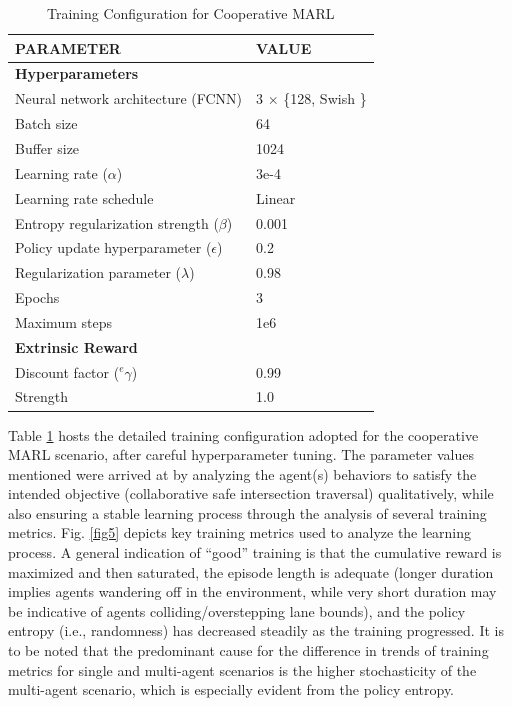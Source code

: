 \documentclass[letterpaper, 10 pt, conference]{ieeeconf}  %
\begin{document}
	\begin{table}[t]
		\caption{Training Configuration for Cooperative MARL}
		\begin{center}
			\begin{tabular}{l|l}
				\hline
				\textbf{PARAMETER}                        & \textbf{VALUE}        \\ \hline
				\multicolumn{2}{l}{\textbf{Hyperparameters}}                      \\ \hline
				Neural network architecture (FCNN)        & 3 $\times$ \{128, Swish \cite{ramachandran2017}\} \\
				Batch size                                & 64                    \\
				Buffer size                               & 1024                  \\
				Learning rate ($\alpha$)                  & 3e-4                  \\
				Learning rate schedule                    & Linear                \\
				Entropy regularization strength ($\beta$) & 0.001                 \\
				Policy update hyperparameter ($\epsilon$) & 0.2                   \\
				Regularization parameter ($\lambda$)      & 0.98                  \\
				Epochs                                    & 3                     \\
				Maximum steps                             & 1e6                   \\ \hline
				\multicolumn{2}{l}{\textbf{Extrinsic Reward}}                     \\ \hline
				Discount factor ($^{e}\gamma$)            & 0.99                  \\
				Strength                                  & 1.0                   \\ \hline
			\end{tabular}
		\end{center}
		\label{tab1}
	\end{table}
	
	Table \ref{tab1} hosts the detailed training configuration adopted for the cooperative MARL scenario, after careful hyperparameter tuning. The parameter values mentioned were arrived at by analyzing the agent(s) behaviors to satisfy the intended objective (collaborative safe intersection traversal) qualitatively, while also ensuring a stable learning process through the analysis of several training metrics. Fig. \ref{fig5} depicts key training metrics used to analyze the learning process. A general indication of ``good'' training is that the cumulative reward is maximized and then saturated, the episode length is adequate (longer duration implies agents wandering off in the environment, while very short duration may be indicative of agents colliding/overstepping lane bounds), and the policy entropy (i.e., randomness) has decreased steadily as the training progressed. It is to be noted that the predominant cause for the difference in trends of training metrics for single and multi-agent scenarios is the higher stochasticity of the multi-agent scenario, which is especially evident from the policy entropy.
	
\end{document}
